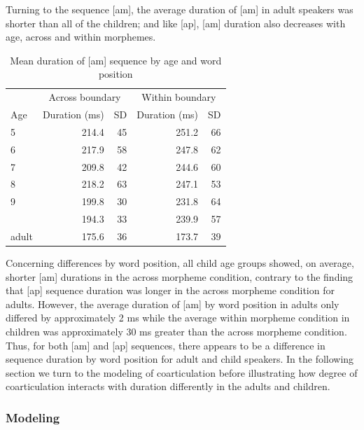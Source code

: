 \documentclass[a4paper,man,floatsintext,natbib,donotrepeattitle, apacite]{apa6}
\begin{document}
Turning to the sequence {[}am{]}, the average duration of {[}am{]} in adult speakers was shorter than all of the children; and like {[}ap{]}, {[}am{]} duration also decreases with age, across and within morphemes.


\begin{table}[H]

\caption{\label{tab:am-dur-tbl}Mean duration of [am] sequence by age and word position}
\centering
\begin{tabular}[t]{lrrrr}
\toprule
\multicolumn{1}{c}{ } & \multicolumn{2}{c}{Across boundary} & \multicolumn{2}{c}{Within boundary} \\
\cmidrule(l{3pt}r{3pt}){2-3} \cmidrule(l{3pt}r{3pt}){4-5}
Age & Duration (ms) & SD  & Duration (ms) & SD\\
\midrule
5 & 214.4 & 45 & 251.2 & 66\\
6 & 217.9 & 58 & 247.8 & 62\\
7 & 209.8 & 42 & 244.6 & 60\\
8 & 218.2 & 63 & 247.1 & 53\\
9 & 199.8 & 30 & 231.8 & 64\\
\addlinespace
10 & 194.3 & 33 & 239.9 & 57\\
adult & 175.6 & 36 & 173.7 & 39\\
\bottomrule
\end{tabular}
\end{table}

Concerning differences by word position, all child age groups showed, on average, shorter {[}am{]} durations in the across morpheme condition, contrary to the finding that {[}ap{]} sequence duration was longer in the across morpheme condition for adults. However, the average duration of {[}am{]} by word position in adults only differed by approximately 2 ms while the average within morpheme condition in children was approximately 30 ms greater than the across morpheme condition. Thus, for both {[}am{]} and {[}ap{]} sequences, there appears to be a difference in sequence duration by word position for adult and child speakers. In the following section we turn to the modeling of coarticulation before illustrating how degree of coarticulation interacts with duration differently in the adults and children.

\subsubsection{Modeling}\label{coartic-dur-model}
\end{document}
